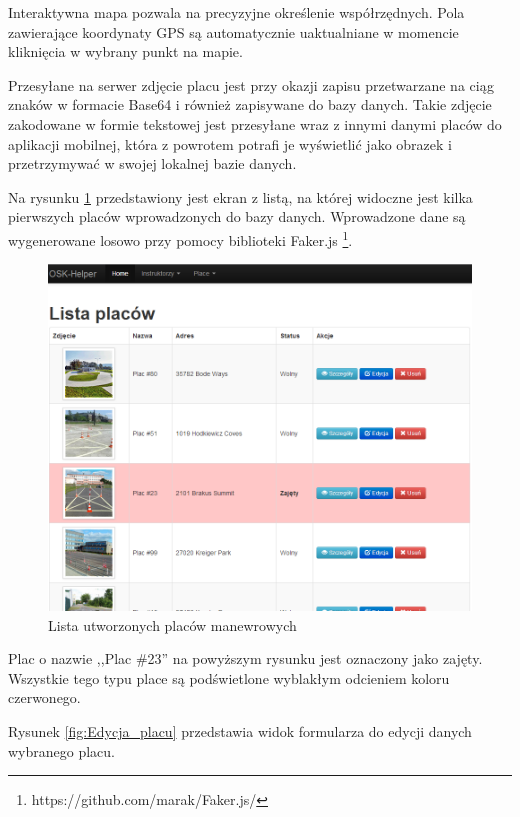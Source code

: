 \documentclass[twoside,a4paper,openright,12pt]{book}
\begin{document}
Interaktywna mapa pozwala na precyzyjne określenie współrzędnych. Pola zawierające koordynaty GPS są automatycznie uaktualniane w momencie kliknięcia w wybrany punkt na mapie.

Przesyłane na serwer zdjęcie placu jest przy okazji zapisu przetwarzane na ciąg znaków w formacie Base64  i również zapisywane do bazy danych.
Takie zdjęcie zakodowane w formie tekstowej jest przesyłane wraz z innymi danymi placów do aplikacji mobilnej, która z powrotem potrafi je wyświetlić jako obrazek i przetrzymywać w swojej lokalnej bazie danych.\newline \newline


Na rysunku \ref{fig:Lista_placow} przedstawiony jest ekran z listą, na której widoczne jest kilka pierwszych placów wprowadzonych do bazy danych. Wprowadzone dane są wygenerowane losowo przy pomocy biblioteki Faker.js \footnote{https://github.com/marak/Faker.js/}.

\begin{figure}[H]
\centering
\includegraphics[width=1\textwidth]{screenshots/panel/lista_placow.png}
\caption{Lista utworzonych placów manewrowych}
\label{fig:Lista_placow}
\end{figure}

Plac o nazwie ,,Plac \#23'' na powyższym rysunku jest oznaczony jako zajęty. Wszystkie tego typu place są podświetlone wyblakłym odcieniem koloru czerwonego.

\newpage
Rysunek \ref{fig:Edycja_placu} przedstawia widok formularza do edycji danych wybranego placu.
\end{document}
